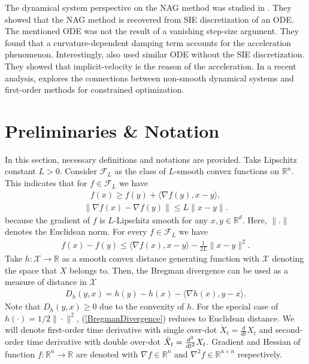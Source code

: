 \documentclass{article}
\theoremstyle{plain}
\theoremstyle{definition}
\theoremstyle{remark}
\begin{document}
The dynamical system perspective on the NAG method was studied in \cite{muehlebach2019dynamical}. They showed that the NAG method is recovered from SIE discretization of an ODE. The mentioned ODE was not the result of a vanishing step-size argument. They found that a curvature-dependent damping term accounts for the acceleration phenomenon. Interestingly, \cite{chen2022gradient} also used similar ODE without the SIE discretization. They showed that implicit-velocity is the reason of the acceleration. In a recent analysis, \cite{muehlebach2023accelerated} explores the connections between non-smooth dynamical systems and first-order methods for constrained optimization.
\section{Preliminaries \& Notation}\label{sec_prel}
In this section, necessary definitions and notations are provided. 
Take Lipschitz constant $L>0$. Consider $\mathcal{F}_L$ as the class of $L$-smooth convex functions on $\mathbb{R}^n$. This indicates that for $f\in\mathcal{F}_L$ we have
\begin{align}\label{convexity}
    f(x)\geq f(y)+\langle \nabla f(y),x-y \rangle, \tag{Convexity}
\end{align}
\begin{align}\label{smoothness}
    \|\nabla f(x)-\nabla f(y)\|\leq L\|x-y\|.\tag{L-Lipschitz}
\end{align}
because the gradient of $f$ is $L$-Lipschitz smooth for any $x,y\in \mathbb{R}^d$. Here, $\|.\|$ denotes the Euclidean norm. For every $f\in\mathcal{F}_L$ we have
\begin{align}\label{cvx-smthness}
  f(x)-f(y)\leq \langle \nabla f(x),x-y \rangle-\frac{1}{2L}\|x-y\|^2. 
\end{align}
Take $h:\mathcal{X}\rightarrow \mathbb{R}$ as a smooth convex distance generating function with $\mathcal{X}$ denoting the space that $X$ belongs to. Then, the Bregman divergence can be used as a measure of distance in $\mathcal{X}$
\begin{align}\label{BregmanDivergence}
    D_h(y,x)= h(y)-h(x)-\langle \nabla h(x),y-x\rangle.
\end{align}
Note that $D_h(y,x)\geq 0$ due to the convexity of $h$. For the special case of $h(\cdot)=1/2\|\cdot\|^2$, (\ref{BregmanDivergence}) reduces to Euclidean distance. We will denote first-order time derivative with single over-dot $\dot X_t =\tfrac{d}{dt}X_t$ and  second-order time derivative with double over-dot $\Ddot X_t =\tfrac{d^2}{dt^2}X_t$. Gradient and Hessian of function $f:\mathbb R^n\rightarrow \mathbb R$ are denoted with $\nabla f\in \mathbb R^{n}$ and $\nabla ^2 f\in \mathbb R^{n\times n}$ respectively. 
\end{document}
